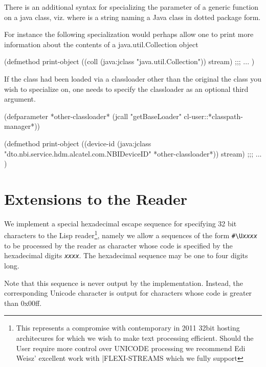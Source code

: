 \documentclass[10pt]{book}
\begin{document}
There is an additional syntax for specializing the parameter of a
generic function on a java class, viz. 
where  is a string naming a Java class in dotted package
form.

For instance the following specialization would perhaps allow one to
print more information about the contents of a java.util.Collection
object

\begin{listing-lisp}
(defmethod print-object ((coll (java:jclass "java.util.Collection"))
                         stream)
  ;;; ...
)
\end{listing-lisp}

If the class had been loaded via a classloader other than the original
the class you wish to specialize on, one needs to specify the
classloader as an optional third argument.

\begin{listing-lisp}

(defparameter *other-classloader*
  (jcall "getBaseLoader" cl-user::*classpath-manager*))
  
(defmethod print-object
   ((device-id (java:jclass "dto.nbi.service.hdm.alcatel.com.NBIDeviceID" 
                            *other-classloader*))
    stream)
  ;;; ...
)
\end{listing-lisp}

\section{Extensions to the Reader}

We implement a special hexadecimal escape sequence for specifying 32
bit characters to the Lisp reader\footnote{This represents a
  compromise with contemporary in 2011 32bit hosting architecures for
  which we wish to make text processing efficient.  Should the User
  require more control over \textsc{UNICODE} processing we recommend Edi Weisz'
  excellent work with \textsc|{FLEXI-STREAMS}  which we fully support}, namely we
allow a sequences of the form \verb~#\U~\emph{\texttt{xxxx}} to be processed
by the reader as character whose code is specified by the hexadecimal
digits \emph{\texttt{xxxx}}.  The hexadecimal sequence may be one to four digits
long.  %

Note that this sequence is never output by the implementation.  Instead,
the corresponding Unicode character is output for characters whose
code is greater than 0x00ff.
\end{document}
